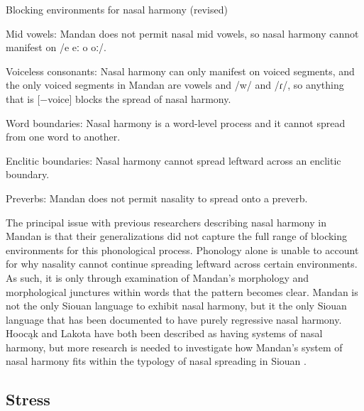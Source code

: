 \largerpage
\begin{exe}

\item\label{ThreeBlockingEnvironmentsRedux} Blocking environments for nasal harmony (revised)

	\begin{xlist}

	\item Mid vowels: Mandan does not permit nasal mid vowels, so nasal harmony cannot manifest on /e eː o oː/.

	\item Voiceless consonants: Nasal harmony can only manifest on voiced segments, and the only voiced segments in Mandan are vowels and /w/ and /ɾ/, so anything that is [$-$voice] blocks the spread of nasal harmony.

	\item Word boundaries: Nasal harmony is a word-level process and it cannot spread from one word to another.

	\item Enclitic boundaries: Nasal harmony cannot spread leftward across an enclitic boundary.

	\item Preverbs: Mandan does not permit nasality to spread onto a preverb.

	\end{xlist}

\end{exe}

The principal issue with previous researchers describing nasal harmony in Mandan is that their generalizations did not capture the full range of blocking environments for this phonological process. Phonology alone is unable to account for why nasality cannot continue spreading leftward across certain environments. As such, it is only through examination of Mandan's morphology and morphological junctures within words that the pattern becomes clear. Mandan is not the only Siouan language to exhibit nasal harmony, but it the only Siouan language that has been documented to have purely regressive nasal harmony. Hoocąk and Lakota have both been described as having systems of nasal harmony, but more research is needed to investigate how Mandan's system of nasal harmony fits within the typology of nasal spreading in Siouan \citep{kasaklundquist2019,panick2021}.


\subsection{Stress}\label{stress}

